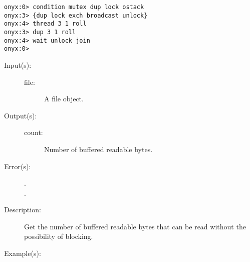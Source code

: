 \begin{description}
\begin{description}
\begin{verbatim}
onyx:0> condition mutex dup lock ostack
onyx:3> {dup lock exch broadcast unlock}
onyx:4> thread 3 1 roll
onyx:3> dup 3 1 roll
onyx:4> wait unlock join
onyx:0>
		\end{verbatim}
	\end{description}
\label{systemdict:bytesavailable}
\item[{\onyxop{file}{bytesavailable}{count}}: ]
	\begin{description}\item[]
	\item[Input(s): ]
		\begin{description}\item[]
		\item[file: ]
			A file object.
		\end{description}
	\item[Output(s): ]
		\begin{description}\item[]
		\item[count: ]
			Number of buffered readable bytes.
		\end{description}
	\item[Error(s): ]
		\begin{description}\item[]
		\item[.]
		\item[.]
		\end{description}
	\item[Description: ]
		Get the number of buffered readable bytes that can be read
		without the possibility of blocking.
	\item[Example(s): ]\begin{verbatim}


\end{verbatim}
\end{description}
\end{description}
